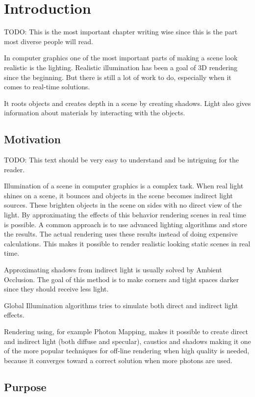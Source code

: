 \chapter{Introduction}\label{cha:intro}

TODO: This is the most important chapter writing wise since this is the part most diverse people will read.

In computer graphics one of the most important parts of making a scene look realistic is the lighting. Realistic illumination has been a goal of 3D rendering since the beginning. But there is still a lot of work to do, especially when it comes to real-time solutions.

It roots objects and creates depth in a scene by creating shadows. Light also gives information about materials by interacting with the objects. 

\section{Motivation}

TODO: This text should be very easy to understand and be intriguing for the reader.

Illumination of a scene in computer graphics is a complex task. When real light shines on a scene, it bounces and objects in the scene becomes indirect light sources. These brighten objects in the scene on sides with no direct view of the light. By approximating the effects of this behavior rendering scenes in real time is possible. 
A common approach is to use advanced lighting algorithms and store the results. The actual rendering uses these results instead of doing expensive calculations. This makes it possible to render realistic looking static scenes in real time. 

Approximating shadows from indirect light is usually solved by Ambient Occlusion. The goal of this method is to make corners and tight spaces darker since they should receive less light.

Global Illumination algorithms tries to simulate both direct and indirect light effects.  

Rendering using, for example Photon Mapping, makes it possible to create direct and indirect light (both diffuse and specular), caustics and shadows making it one of the more popular techniques for off-line rendering when high quality is needed, because it converges toward a correct solution when more photons are used.

\section{Purpose}

